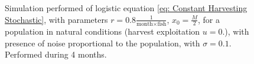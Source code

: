 \begin{figure}[H]
	\caption{Simulation performed of logistic equation \ref{eq: Constant Harvesting Stochastic}, with parameters $r=0.8\frac{1}{\text{month}\times\text{fish}}$, $x_0=\frac{M}{2}$, for a population in natural conditions (harvest exploitation $u=0$.), with presence of noise proportional to the population, with $\sigma=0.1$. Performed during 4 months.  }
\end{figure}


